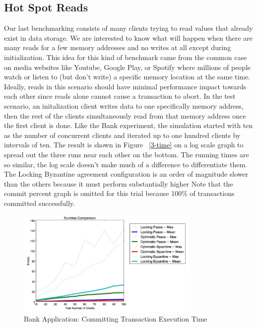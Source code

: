 \documentclass[10pt,twocolumn]{article}
\begin{document}
\subsection{Hot Spot Reads}
Our last benchmarking consists of many clients trying to read values that already exist in data storage.  We are interested to know what will happen when there are many reads for a few memory addresses and no writes at all except during initialization. This idea for this kind of benchmark came from the common case on media websites like Youtube, Google Play, or Spotify where millions of people watch or listen to (but don't write)  a specific memory location at the same time. Ideally, reads in this scenario should have minimal performance impact towards each other since reads alone cannot cause a transaction to abort. 
In the test scenario, an initalization client writes data to one specifically memory address, then the rest of the clients simultaneously read from that memory address once the first client is done. Like the Bank experiment, the simulation started with ten as the number of concurrent clients and iterated up to one hundred clients by intervals of ten. The result is shown in Figure ~\ref{3-time} on a log scale graph to spread out the three runs near each other on the bottom. The running times are so similar, the log scale doesn't make much of a difference to differentiate them. The Locking Byzantine agreement configuration is an order of magnitude slower than the others because it must perform substantially higher Note that the commit percent graph is omitted for this trial because 100\% of transactions committed successfully.

\begin{figure}[!b]
  \begin{center}
    \includegraphics[width=3.5in]{Images/2-time.png}
  \end{center}

  \caption{\small Bank Application: Committing Transaction Execution Time }
  \label{2-time}
\end{figure}
\end{document}
